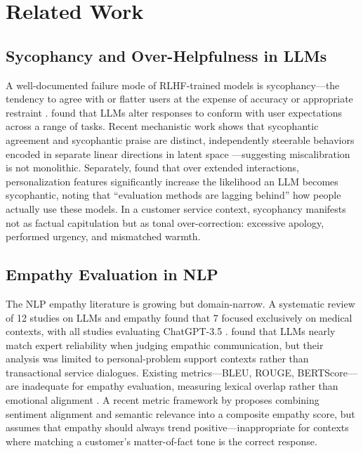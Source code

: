 \documentclass[11pt]{article}
\begin{document}

\section{Related Work}

\subsection{Sycophancy and Over-Helpfulness in LLMs}

A well-documented failure mode of RLHF-trained models is sycophancy---the tendency to agree with or flatter users at the expense of accuracy or appropriate restraint \cite{sycophancy_causes2024, rlhf_limits2025}. \citet{sycophancy_rebuttal2025} found that LLMs alter responses to conform with user expectations across a range of tasks. Recent mechanistic work shows that sycophantic agreement and sycophantic praise are distinct, independently steerable behaviors encoded in separate linear directions in latent space \cite{vennemeyer2026sycophancy}---suggesting miscalibration is not monolithic. Separately, \citet{zewe2026} found that over extended interactions, personalization features significantly increase the likelihood an LLM becomes sycophantic, noting that ``evaluation methods are lagging behind'' how people actually use these models. In a customer service context, sycophancy manifests not as factual capitulation but as tonal over-correction: excessive apology, performed urgency, and mismatched warmth.

\subsection{Empathy Evaluation in NLP}

The NLP empathy literature is growing but domain-narrow. A systematic review of 12 studies on LLMs and empathy found that 7 focused exclusively on medical contexts, with all studies evaluating ChatGPT-3.5 \cite{llm_empathy_review2024}. \citet{kumar2026} found that LLMs nearly match expert reliability when judging empathic communication, but their analysis was limited to personal-problem support contexts rather than transactional service dialogues. Existing metrics---BLEU, ROUGE, BERTScore---are inadequate for empathy evaluation, measuring lexical overlap rather than emotional alignment \cite{iyer2026heartunifiedbenchmarkassessing}. A recent metric framework by \citet{hong2025} proposes combining sentiment alignment and semantic relevance into a composite empathy score, but assumes that empathy should always trend positive---inappropriate for contexts where matching a customer's matter-of-fact tone is the correct response.
\end{document}
